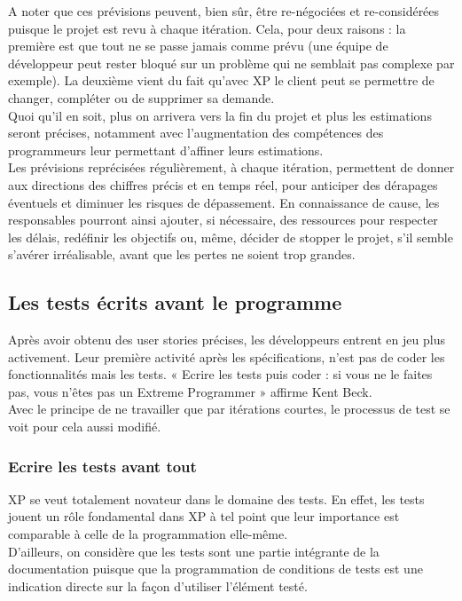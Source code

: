 \documentclass[]{article}
\begin{document}
A noter que ces prévisions peuvent, bien sûr, être re-négociées et
re-considérées puisque le projet est revu à chaque itération. Cela, pour
deux raisons : la première est que tout ne se passe jamais comme prévu
(une équipe de développeur peut rester bloqué sur un problème qui ne
semblait pas complexe par exemple). La deuxième vient du fait qu'avec XP
le client peut se permettre de changer, compléter ou de supprimer sa
demande.~\\
Quoi qu'il en soit, plus on arrivera vers la fin du projet et plus les
estimations seront précises, notamment avec l'augmentation des
compétences des programmeurs leur permettant d'affiner leurs
estimations.\\
Les prévisions reprécisées régulièrement, à chaque itération, permettent
de donner aux directions des chiffres précis et en temps réel, pour
anticiper des dérapages éventuels et diminuer les risques de
dépassement. En connaissance de cause, les responsables pourront ainsi
ajouter, si nécessaire, des ressources pour respecter les délais,
redéfinir les objectifs ou, même, décider de stopper le projet, s'il
semble s'avérer irréalisable, avant que les pertes ne soient trop
grandes.~




\hypertarget{les-tests-uxe9crits-avant-le-programme}{%
\subsection{\texorpdfstring{\textbf{Les tests écrits avant le
programme}}{Les tests écrits avant le programme}}\label{les-tests-uxe9crits-avant-le-programme}}

Après avoir obtenu des user stories précises, les développeurs entrent
en jeu plus activement. Leur première activité après les spécifications,
n'est pas de coder les fonctionnalités mais les tests. « Ecrire les
tests puis coder : si vous ne le faites pas, vous n'êtes pas un Extreme
Programmer » affirme Kent Beck.\\
Avec le principe de ne travailler que par itérations courtes, le
processus de test se voit pour cela aussi modifié.




\hypertarget{ecrire-les-tests-avant-tout}{%
\subsubsection{Ecrire les tests avant
tout}\label{ecrire-les-tests-avant-tout}}

XP se veut totalement novateur dans le domaine des tests. En effet, les
tests jouent un rôle fondamental dans XP à tel point que leur importance
est comparable à celle de la programmation elle-même.\\
D'ailleurs, on considère que les tests sont une partie intégrante de la
documentation puisque que la programmation de conditions de tests est
une indication directe sur la façon d'utiliser l'élément testé.
\end{document}
